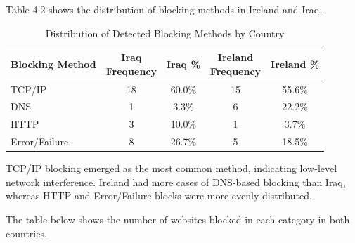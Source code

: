 Table 4.2 shows the distribution of blocking methods in Ireland and Iraq.

\vspace{2em}

\begin{table}[H] 
\centering 
\caption{Distribution of Detected Blocking Methods by Country} 
\begin{tabular}{lcccc} 
\toprule 
\textbf{Blocking Method} & \shortstack{\textbf{Iraq} \\ \textbf{Frequency}} & \textbf{Iraq \%} & \shortstack{\textbf{Ireland} \\ \textbf{Frequency}} & \textbf{Ireland \%} \\
\midrule 
TCP/IP         & 18 & 60.0\%  & 15 & 55.6\% \\
DNS            & 1  & 3.3\%   & 6  & 22.2\% \\
HTTP           & 3  & 10.0\%  & 1  & 3.7\% \\
Error/Failure  & 8  & 26.7\%  & 5  & 18.5\% \\
\bottomrule 
\end{tabular} 
\label{tab:blocking_methods_comparison} 
\end{table}

TCP/IP blocking emerged as the most common method, indicating low-level network interference. Ireland had more cases of DNS-based blocking than Iraq, whereas HTTP and Error/Failure blocks were more evenly distributed.

The table below shows the number of websites blocked in each category in both countries.

\vspace{2em}

